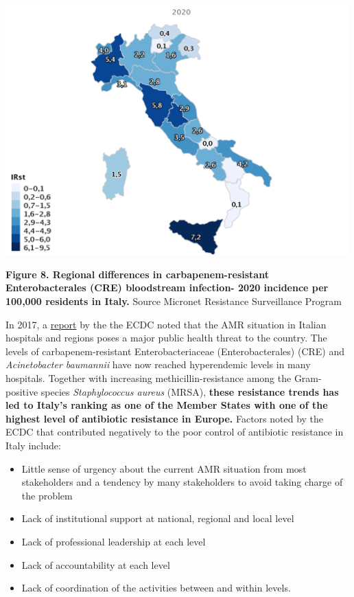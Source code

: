 \documentclass[
]{book}
\providecommand{\tightlist}{%
  \setlength{\itemsep}{0pt}\setlength{\parskip}{0pt}}
\begin{document}
\includegraphics[width=5.20833in,height=\textheight]{images/Italia_CRE.png}

\textbf{Figure 8. Regional differences in carbapenem-resistant Enterobacterales (CRE) bloodstream infection- 2020 incidence per 100,000 residents in Italy.} Source Micronet Resistance Surveillance Program

In 2017, a \href{https://www.ecdc.europa.eu/en/publications-data/ecdc-country-visit-italy-discuss-antimicrobial-resistance-issues}{report} by the the ECDC noted that the AMR situation in Italian hospitals and regions poses a major public health threat to the country. The levels of carbapenem-resistant Enterobacteriaceae (Enterobacterales) (CRE) and \emph{Acinetobacter baumannii} have now reached hyperendemic levels in many hospitals. Together with increasing methicillin-resistance among the Gram-positive species \emph{Staphylococcus aureus} (MRSA), \textbf{these resistance trends has led to Italy's ranking as one of the Member States with one of the highest level of antibiotic resistance in Europe.} Factors noted by the ECDC that contributed negatively to the poor control of antibiotic resistance in Italy include:

\begin{itemize}
\tightlist
\item
  Little sense of urgency about the current AMR situation from most stakeholders and a tendency by many stakeholders to avoid taking charge of the problem
\item
  Lack of institutional support at national, regional and local level
\item
  Lack of professional leadership at each level
\item
  Lack of accountability at each level
\item
  Lack of coordination of the activities between and within levels.
\end{itemize}
\end{document}
